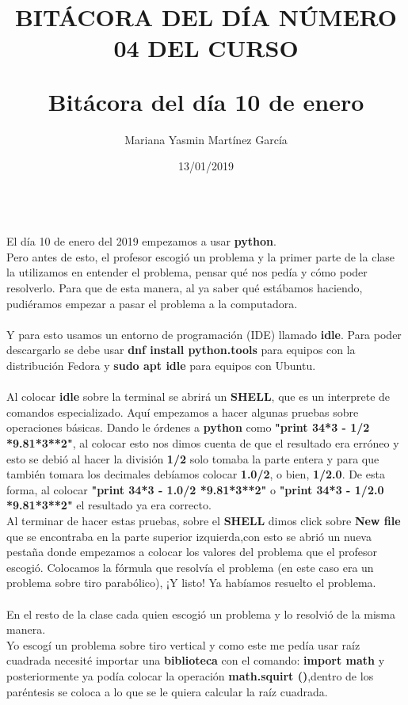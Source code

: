 \documentclass[letterpaper, 12pt, twoside]{article}
\title{\Huge\item\color{red}\textbf {BITÁCORA DEL DÍA NÚMERO 04 DEL CURSO}}
\author{Mariana Yasmin Martínez García}
\date{13/01/2019}
\begin{document}
	\maketitle
	
	\newpage
	\title{\huge\textbf{Bitácora del día 10 de enero\\}} \\
	El día 10 de enero del 2019 empezamos a usar \textbf{python}. \\
	Pero antes de esto, el profesor escogió un problema y la primer parte de la clase la utilizamos en entender el problema, pensar qué nos pedía y cómo poder resolverlo. Para que de esta manera, al ya saber qué estábamos haciendo, pudiéramos empezar a pasar el problema a la computadora. \\ \\
	Y para esto usamos un entorno de programación (IDE) llamado \textbf{idle}. Para poder descargarlo se debe usar \textbf{dnf install python.tools} para equipos con la distribución Fedora y \textbf{sudo apt idle} para equipos con Ubuntu. \\ \\
	Al colocar \textbf{idle} sobre la terminal se abrirá un \textbf{SHELL}, que es un interprete de comandos especializado. Aquí empezamos a hacer algunas pruebas sobre operaciones básicas. Dando le órdenes a \textbf{python} como \textbf{"print  34*3 - 1/2 *9.81*3**2"}, al colocar esto nos dimos cuenta de que el resultado era erróneo y esto se debió al hacer la división \textbf{1/2} solo tomaba la parte entera y para que también tomara los decimales debíamos colocar \textbf{1.0/2}, o bien, \textbf{1/2.0}. De esta forma, al colocar \textbf{"print  34*3 - 1.0/2 *9.81*3**2"} o \textbf{"print  34*3 - 1/2.0 *9.81*3**2"} el resultado ya era correcto.\\
	Al terminar de hacer estas pruebas, sobre el \textbf{SHELL} dimos click sobre \textbf{New file} que se encontraba en la parte superior izquierda,con esto se abrió un nueva pestaña donde empezamos a colocar los valores del problema que el profesor escogió. Colocamos la fórmula que resolvía el problema (en este caso era un problema sobre tiro parabólico), ¡Y listo! Ya habíamos resuelto el problema. \\ \\
	En el resto de la clase cada quien escogió un problema y lo resolvió de la misma manera. \\
	Yo escogí un problema sobre tiro vertical y como este me pedía usar raíz cuadrada necesité importar una \textbf{biblioteca} con el comando: \textbf{import math } y posteriormente ya podía colocar la operación \textbf{math.squirt ()},dentro de los paréntesis se coloca a lo que se le quiera calcular la raíz cuadrada.
	
\end{document}
